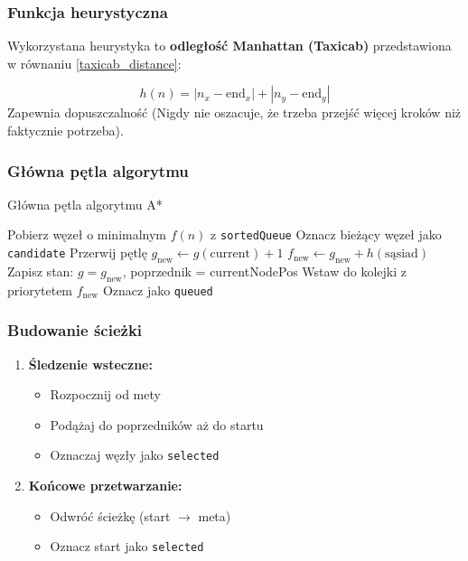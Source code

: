 \documentclass[../../../../doc.tex]{subfiles}
\begin{document}
\subsubsection{Funkcja heurystyczna}
Wykorzystana heurystyka to \textbf{odległość Manhattan (Taxicab)} przedstawiona w równaniu \ref{taxicab_distance}:

\begin{equation}
  h(n) = |n_x - \text{end}_x| + |n_y - \text{end}_y|
  \label{taxicab_distance}
\end{equation}
Zapewnia dopuszczalność (Nigdy nie oszacuje, że trzeba przejść więcej kroków niż faktycznie potrzeba).

\subsubsection{Główna pętla algorytmu}



\begin{algorithm}
  \caption{Główna pętla algorytmu A*}
  \begin{algorithmic}
    \STATE Pobierz węzeł o minimalnym $f(n)$ z \texttt{sortedQueue}
    \STATE Oznacz bieżący węzeł jako \texttt{candidate}
    \STATE Przerwij pętlę
    \ENDIF
    \STATE $g_{\text{new}} \gets g(\text{current}) + 1$
    \STATE $f_{\text{new}} \gets g_{\text{new}} + h(\text{sąsiad})$
    \STATE Zapisz stan: $g = g_{\text{new}}$, poprzednik = currentNodePos
    \STATE Wstaw do kolejki z priorytetem $f_{\text{new}}$
    \STATE Oznacz jako \texttt{queued}
    \ENDIF
    \ENDFOR
    \ENDWHILE
  \end{algorithmic}
\end{algorithm}

\subsubsection{Budowanie ścieżki}
\begin{enumerate}
  \item \textbf{Śledzenie wsteczne:}
        \begin{itemize}
          \item Rozpocznij od mety
          \item Podążaj do poprzedników aż do startu
          \item Oznaczaj węzły jako \texttt{selected}
        \end{itemize}
  \item \textbf{Końcowe przetwarzanie:}
        \begin{itemize}
          \item Odwróć ścieżkę (start $\rightarrow$ meta)
          \item Oznacz start jako \texttt{selected}
        \end{itemize}
\end{enumerate}
\end{document}
